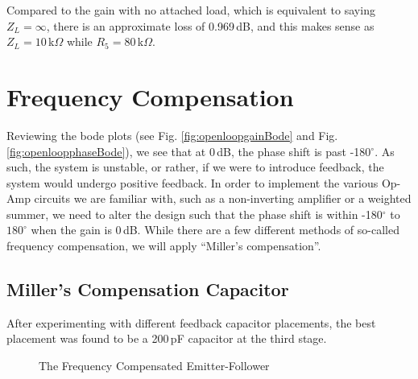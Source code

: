 \documentclass[lettersize,journal]{IEEEtran}
\begin{document}
Compared to the gain with no attached load, which is equivalent to saying 
$Z_L = \infty$, there is an approximate loss of 0.969$\,$dB, and this makes 
sense as $Z_L = 10\,$k$\Omega$ while $R_5 = 80\,$k$\Omega$.

\section{Frequency Compensation}
Reviewing %
the bode plots (see Fig. \ref{fig:openloopgainBode} and 
Fig. \ref{fig:openloopphaseBode}), we see that at 0$\,$dB, 
the phase shift is past -180$^\circ$. As such, the system is 
unstable, or rather, if we were to introduce feedback, the 
system would undergo positive feedback. In order to implement 
the various Op-Amp circuits we are familiar with, such as a 
non-inverting amplifier or a weighted summer, we need to 
alter the design such that the phase shift is within -180$^\circ$ 
to $180^\circ$ when the gain is 0$\,$dB. While there are a few 
different methods of so-called frequency compensation, 
we will apply ``Miller's compensation''.

\subsection{Miller's Compensation Capacitor}
After experimenting with different feedback
capacitor placements, the best placement was 
found to be a 200$\,$pF capacitor at the third stage.

\begin{figure}[H]
  \centering
  \caption{The Frequency Compensated Emitter-Follower}
  \label{fig:emitterfollowerWithCap}
\end{figure}
\end{document}
